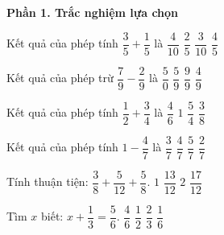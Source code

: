 \textbf{Phần 1. Trắc nghiệm lựa chọn}

\begin{ex} %
Kết quả của phép tính $\dfrac{3}{5} + \dfrac{1}{5}$ là
\choice
{$\dfrac{4}{10}$}
{$\dfrac{2}{5}$}
{$\dfrac{3}{10}$}
{\True $\dfrac{4}{5}$}
\end{ex}

\begin{ex} %
Kết quả của phép trừ $\dfrac{7}{9} - \dfrac{2}{9}$ là
\choice
{$\dfrac{5}{0}$}
{\True $\dfrac{5}{9}$}
{$\dfrac{9}{9}$}
{$\dfrac{4}{9}$}
\end{ex}

\begin{ex} %
Kết quả của phép tính $\dfrac{1}{2} + \dfrac{3}{4}$ là
\choice
{$\dfrac{4}{6}$}
{$1$}
{\True $\dfrac{5}{4}$}
{$\dfrac{3}{8}$}
\end{ex}

\begin{ex} %
Kết quả của phép tính $1 - \dfrac{4}{7}$ là
\choice
{\True $\dfrac{3}{7}$}
{$\dfrac{4}{7}$}
{$\dfrac{5}{7}$}
{$\dfrac{2}{7}$}
\end{ex}

\begin{ex} %
Tính thuận tiện: $\dfrac{3}{8} + \dfrac{5}{12} + \dfrac{5}{8}$.
\choice
{$1$}
{$\dfrac{13}{12}$}
{$2$}
{\True $\dfrac{17}{12}$}
\end{ex}

\begin{ex} %
Tìm $x$ biết: $x + \dfrac{1}{3} = \dfrac{5}{6}$.
\choice
{$\dfrac{4}{6}$}
{\True $\dfrac{1}{2}$}
{$\dfrac{2}{3}$}
{$\dfrac{1}{6}$}
\end{ex}

